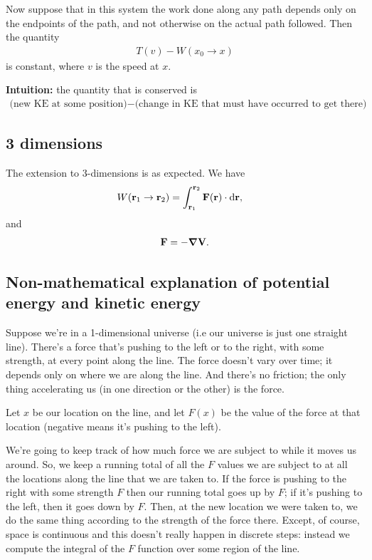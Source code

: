 Now suppose that in this system the work done along any path depends only on the endpoints of the
path, and not otherwise on the actual path followed. Then the quantity
\begin{align*}
  T(v) - W(x_0 \to x)
\end{align*}
is constant, where $v$ is the speed at $x$.

{\bf Intuition:} the quantity that is conserved is
\begin{align*}
  \text{(new KE at some position)} - \text{(change in KE that must have occurred to get there)}
\end{align*}

\subsection{3 dimensions}

The extension to 3-dimensions is as expected. We have
\begin{align*}
  W(\r_1 \to \r_2) &= \int_{\r_1}^{\r_2} \F(\r) \cdot \d\r,
\end{align*}
and
\begin{align*}
  \mathbf{F} = -\grad \mathbf{V}.
\end{align*}



\subsection{Non-mathematical explanation of potential energy and kinetic energy}

Suppose we're in a 1-dimensional universe (i.e our universe is just one straight line). There's a
force that's pushing to the left or to the right, with some strength, at every point along the
line. The force doesn't vary over time; it depends only on where we are along the line. And there's
no friction; the only thing accelerating us (in one direction or the other) is the force.


Let $x$ be our location on the line, and let $F(x)$ be the value of the force at that location
(negative means it's pushing to the left).

We're going to keep track of how much force we are subject to while it moves us around. So, we keep
a running total of all the $F$ values we are subject to at all the locations along the line that we
are taken to. If the force is pushing to the right with some strength $F$ then our running total
goes up by $F$; if it's pushing to the left, then it goes down by $F$. Then, at the new location we
were taken to, we do the same thing according to the strength of the force there. Except, of course,
space is continuous and this doesn't really happen in discrete steps: instead we compute the
integral of the $F$ function over some region of the line.

